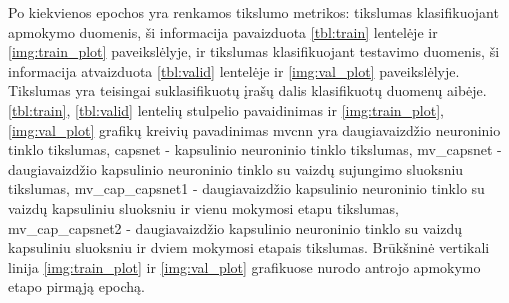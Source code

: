 Po kiekvienos epochos yra renkamos tikslumo metrikos: tikslumas klasifikuojant apmokymo duomenis, ši informacija pavaizduota \ref{tbl:train} lentelėje ir \ref{img:train_plot} paveikslėlyje, ir tikslumas klasifikuojant testavimo duomenis, ši informacija atvaizduota \ref{tbl:valid} lentelėje ir \ref{img:val_plot} paveikslėlyje. Tikslumas yra teisingai suklasifikuotų įrašų dalis klasifikuotų duomenų aibėje. \ref{tbl:train}, \ref{tbl:valid} lentelių stulpelio pavaidinimas ir \ref{img:train_plot}, \ref{img:val_plot} grafikų kreivių pavadinimas mvcnn yra daugiavaizdžio neuroninio tinklo tikslumas, capsnet - kapsulinio neuroninio tinklo tikslumas, mv\_capsnet - daugiavaizdžio kapsulinio neuroninio tinklo su vaizdų sujungimo sluoksniu tikslumas, mv\_cap\_capsnet1 - daugiavaizdžio kapsulinio neuroninio tinklo su vaizdų kapsuliniu sluoksniu ir vienu mokymosi etapu tikslumas, mv\_cap\_capsnet2 - daugiavaizdžio kapsulinio neuroninio tinklo su vaizdų kapsuliniu sluoksniu ir dviem mokymosi etapais tikslumas. Brūkšninė vertikali linija \ref{img:train_plot} ir \ref{img:val_plot} grafikuose nurodo antrojo apmokymo etapo pirmąją epochą.

